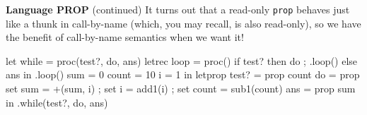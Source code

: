 \begin{minipage}[t]{\sw}
\slidenumber
\LARGE
{\bf Language PROP} (continued)\exx
It turns out that a read-only \verb'prop' behaves just like a thunk
in call-by-name (which, you may recall, is also read-only),
so we have the benefit of call-by-name semantics when we want it!
\Large
\begin{qv}
let
  while = proc(test?, do, ans)
    letrec
      loop = proc()
        if test? then {do ; .loop()} else ans
    in
      .loop()
  sum = 0
  count = 10
  i = 1
in
  letprop
    test? = prop count
    do = prop { set sum = +(sum, i)
              ; set i = add1(i)
              ; set count = sub1(count)
              }
    ans = prop sum
  in
    .while(test?, do, ans) %
\end{qv}
\end{minipage}
